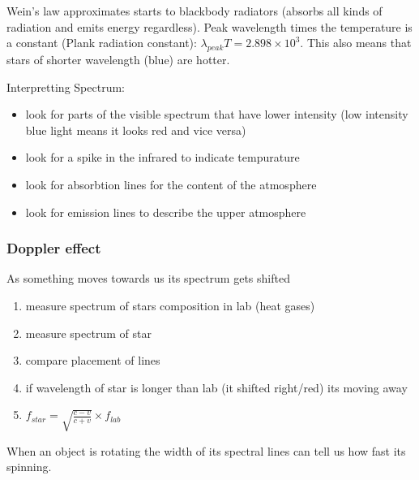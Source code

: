 \documentclass[12pt]{article}
\begin{document}
Wein's law approximates starts to blackbody radiators (absorbs all kinds of radiation and emits energy regardless). Peak wavelength times the temperature is a constant (Plank radiation constant): $\lambda_{peak}T = 2.898\times10^3$. This also means that stars of shorter wavelength (blue) are hotter.

Interpretting Spectrum:
\begin{itemize}
\item look for parts of the visible spectrum that have lower intensity (low intensity blue light means it looks red and vice versa)
\item look for a spike in the infrared to indicate tempurature
\item look for absorbtion lines for the content of the atmosphere
\item look for emission lines to describe the upper atmosphere
\end{itemize}

\subsubsection{Doppler effect}
As something moves towards us its spectrum gets shifted
\begin{enumerate}
\item measure spectrum of stars composition in lab (heat gases)
\item measure spectrum of star
\item compare placement of lines
\item if wavelength of star is longer than lab (it shifted right/red) its moving away
\item $f_{star} = \sqrt{\frac{c-v}{c+v}} \times f_{lab}$
\end{enumerate}

When an object is rotating the width of its spectral lines can tell us how fast its spinning.
\end{document}

